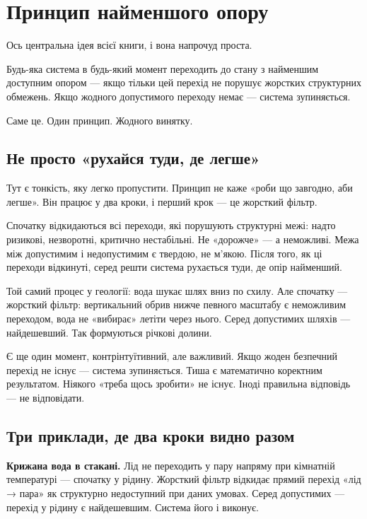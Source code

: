 \documentclass[12pt, a4paper, openany]{book}
\begin{document}
\chapter{Принцип найменшого опору}

Ось центральна ідея всієї книги, і вона напрочуд проста.

Будь-яка система в будь-який момент переходить до стану з найменшим доступним опором --- якщо тільки цей перехід не порушує жорстких структурних обмежень. Якщо жодного допустимого переходу немає --- система зупиняється.

Саме це. Один принцип. Жодного винятку.

\section{Не просто «рухайся туди, де легше»}

Тут є тонкість, яку легко пропустити. Принцип не каже «роби що завгодно, аби легше». Він працює у два кроки, і перший крок --- це жорсткий фільтр.

Спочатку відкидаються всі переходи, які порушують структурні межі: надто ризикові, незворотні, критично нестабільні. Не «дорожче» --- а неможливі. Межа між допустимим і недопустимим є твердою, не м'якою. Після того, як ці переходи відкинуті, серед решти система рухається туди, де опір найменший.

\begin{analogybox}
Той самий процес у геології: вода шукає шлях вниз по схилу. Але спочатку --- жорсткий фільтр: вертикальний обрив нижче певного масштабу є неможливим переходом, вода не «вибирає» летіти через нього. Серед допустимих шляхів --- найдешевший. Так формуються річкові долини.
\end{analogybox}

Є ще один момент, контрінтуїтивний, але важливий. Якщо жоден безпечний перехід не існує --- система зупиняється. Тиша є математично коректним результатом. Ніякого «треба щось зробити» не існує. Іноді правильна відповідь --- не відповідати.

\section{Три приклади, де два кроки видно разом}

\textbf{Крижана вода в стакані.} Лід не переходить у пару напряму при кімнатній температурі --- спочатку у рідину. Жорсткий фільтр відкидає прямий перехід «лід → пара» як структурно недоступний при даних умовах. Серед допустимих --- перехід у рідину є найдешевшим. Система його і виконує.
\end{document}
